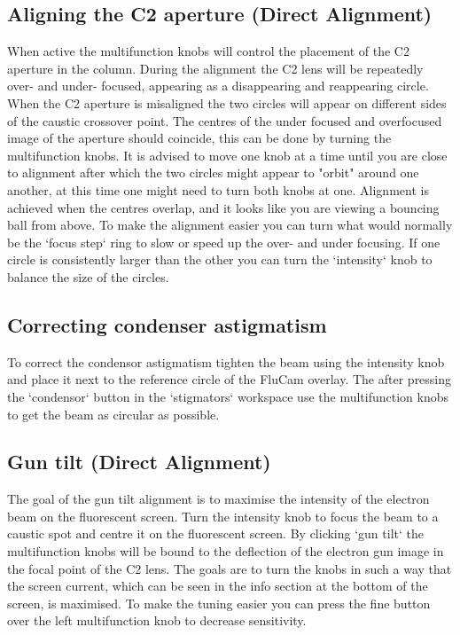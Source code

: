 \documentclass[a4paper]{scrartcl}
\begin{document}
\subsection*{Aligning the C2 aperture (Direct Alignment)}
When active the multifunction knobs will control the placement of the C2 aperture in the column. During the alignment the C2 lens will be repeatedly over- and under- focused, appearing as a disappearing and reappearing circle. When the C2 aperture is misaligned the two circles will appear on different sides of the caustic crossover point. The centres of the under focused and overfocused image of the aperture should coincide, this can be done by turning the multifunction knobs. It is advised to move one knob at a time until you are close to alignment after which the two circles might appear to "orbit" around one another, at this time one might need to turn both knobs at one. Alignment is achieved when the centres overlap, and it looks like you are viewing a bouncing ball from above. To make the alignment easier you can turn what would normally be the `focus step` ring to slow or speed up the over- and under focusing. If one circle is consistently larger than the other you can turn the `intensity` knob to balance the size of the circles.

\subsection*{Correcting condenser astigmatism}
To correct the condensor astigmatism tighten the beam using the intensity knob and place it next to the reference circle of the FluCam overlay. The after pressing the `condensor` button in the `stigmators` workspace use the multifunction knobs to get the beam as circular as possible.

\subsection*{Gun tilt (Direct Alignment)}
The goal of the gun tilt alignment is to maximise the intensity of the electron beam on the fluorescent screen. Turn the intensity knob to focus the beam to a caustic spot and centre it on the fluorescent screen. By clicking `gun tilt` the multifunction knobs will be bound to the deflection of the electron gun image in the focal point of the C2 lens. The goals are to turn the knobs in such a way that the screen current, which can be seen in the info section at the bottom of the screen, is maximised. To make the tuning easier you can press the fine button over the left multifunction knob to decrease sensitivity.
\end{document}
